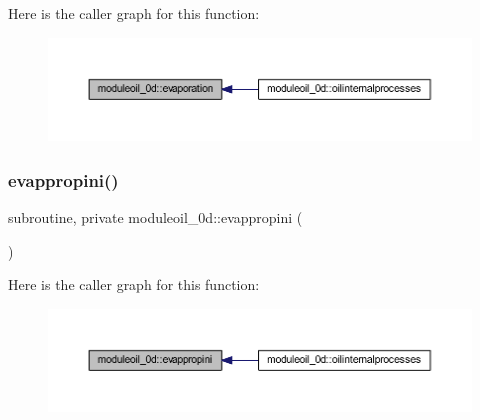 Here is the caller graph for this function\+:\nopagebreak
\begin{figure}[H]
\begin{center}
\leavevmode
\includegraphics[width=350pt]{namespacemoduleoil__0d_ae6b04a828d4410d4e96bd3d91b7287a1_icgraph}
\end{center}
\end{figure}
\mbox{\label{namespacemoduleoil__0d_ae29b450b668a71108a4246a29ec789eb}} 
\subsubsection{\texorpdfstring{evappropini()}{evappropini()}}
{\footnotesize\ttfamily subroutine, private moduleoil\+\_\+0d\+::evappropini (\begin{DoxyParamCaption}{ }\end{DoxyParamCaption})\hspace{0.3cm}{\ttfamily [private]}}

Here is the caller graph for this function\+:\nopagebreak
\begin{figure}[H]
\begin{center}
\leavevmode
\includegraphics[width=350pt]{namespacemoduleoil__0d_ae29b450b668a71108a4246a29ec789eb_icgraph}
\end{center}
\end{figure}
\mbox{\label{namespacemoduleoil__0d_aee91b87fe4777a6a4e92f109ca97d6d5}} 
